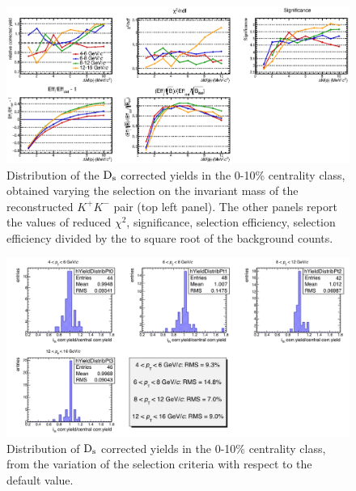 \begin{figure}[!h]
 \begin{center}
   \includegraphics[angle=0, width=15cm]{./FigCap5/cutbycut_invm_010.eps}
 \end{center}
 \caption{Distribution of the ${\rm D_s}$ corrected yields in the 0-10\% centrality class, obtained varying the selection on the invariant mass of the reconstructed $K^+K^-$ pair (top left panel). The other panels report the values of reduced $\chi^2$, significance, selection efficiency, selection efficiency divided by the to square root of the background counts.}
 \label{fig:DeltaMDsCutVar_010} 
\end{figure}
\begin{figure}[!h]
 \begin{center}
   \includegraphics[angle=0, width=15cm]{./FigCap5/FinalSyst_010.png}
 \end{center}
 \caption{Distribution of ${\rm D_s}$ corrected yields in the 0-10\% centrality class, from the variation of the selection criteria with respect to the default value.}
 \label{fig:DsCutVar_010} 
\end{figure}

